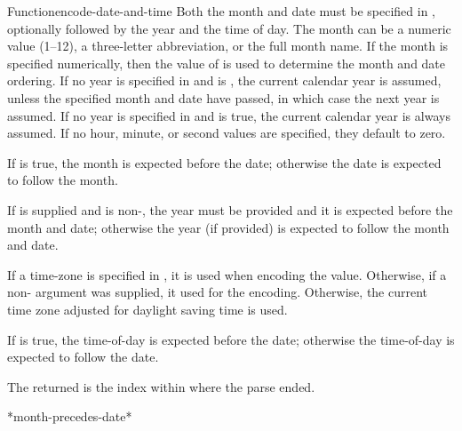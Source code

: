 \documentclass[10pt,twoside,english,pdftex]{article}
\begin{document}
\begin{functiondoc}{Function}{encode-date-and-time}
\fndescription
%
Both the month and date must be specified in , optionally followed
by the year and the time of day. The month can be a numeric value (1--12), a
three-letter abbreviation, or the full month name.  If the month is specified
numerically, then the value of  is used to
determine the month and date ordering. If no year is specified in 
and  is \nil, the current calendar year
is assumed, unless the specified month and date have passed, in which case the
next year is assumed. If no year is specified in  and
 is true, the current calendar year is
always assumed.  If no hour, minute, or second values are specified, they
default to zero.

\W{} 
%
If  is true, the month is expected before the date;
otherwise the date is expected to follow the month.

\W{} 
%
If  is supplied and is non-\nil, the year must be provided
and it is expected before the month and date; otherwise the year (if provided)
is expected to follow the month and date.

\W{} 
%
If a time-zone is specified in , it is used when encoding the
 value.  Otherwise, if a non-\nil{}
 argument was supplied, it used for the encoding.
Otherwise, the current time zone adjusted for daylight saving time is used.

\W{} 
%
If  is true, the time-of-day is expected before the date;
otherwise the time-of-day is expected to follow the date.

\W{} 
%
The returned  is the index within  where the
parse ended.

\begin{alsos}{*month-precedes-date*}
\end{alsos}


\end{functiondoc}
\end{document}
